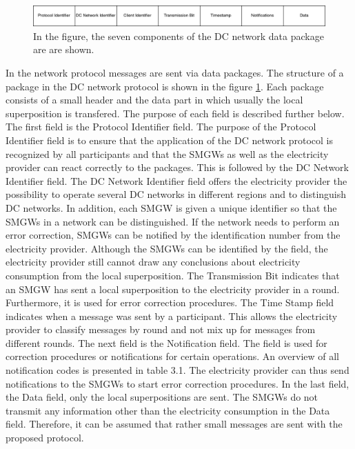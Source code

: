 \\\begin{figure}[tbp]
  \centering
  \includegraphics[width=1\textwidth]{images/Header2.png}
  \caption[DC Network Frame]{
In the figure, the seven components of the DC network data package are
are shown.}
  \label{fig:frame}
\end{figure}In the network protocol messages are sent via data packages. The structure of a package in the DC network protocol is shown in the figure \ref{fig:frame}. Each package consists of a small header and the data part in which usually the local superposition is transfered. The purpose of each field is described further below.\\
The first field is the Protocol Identifier field. The purpose of the Protocol Identifier field is to ensure that the application of the DC network protocol is recognized by all participants and that the \gls{SMGW}s as well as the electricity provider can react correctly to the packages. This is followed by the DC Network Identifier field.%
The DC Network Identifier field offers the electricity provider the possibility to operate several DC networks in different regions and to distinguish DC networks. In addition, each \gls{SMGW} is given a unique identifier so that the \gls{SMGW}s in a network can be distinguished. If the network needs to perform an error correction, \gls{SMGW}s can be notified by the identification number from the electricity provider. Although the \gls{SMGW}s can be identified by the field, the electricity provider still cannot draw any conclusions about electricity consumption from the local superposition. The Transmission Bit indicates that an \gls{SMGW} has sent a local superposition to the electricity provider in a round. Furthermore, it is used for error correction procedures. The Time Stamp field indicates when a message was sent by a participant. This allows the electricity provider to classify messages by round and not mix up for messages from different rounds. The next field is the Notification field. The field is used for correction procedures or notifications for certain operations. An overview of all notification codes is presented in table 3.1. The electricity provider can thus send notifications to the \gls{SMGW}s to start error correction procedures. In the last field, the Data field, only the local superpositions are sent. The \gls{SMGW}s do not transmit any information other than the electricity consumption in the Data field. Therefore, it can be assumed that rather small messages are sent with the proposed protocol.\\
